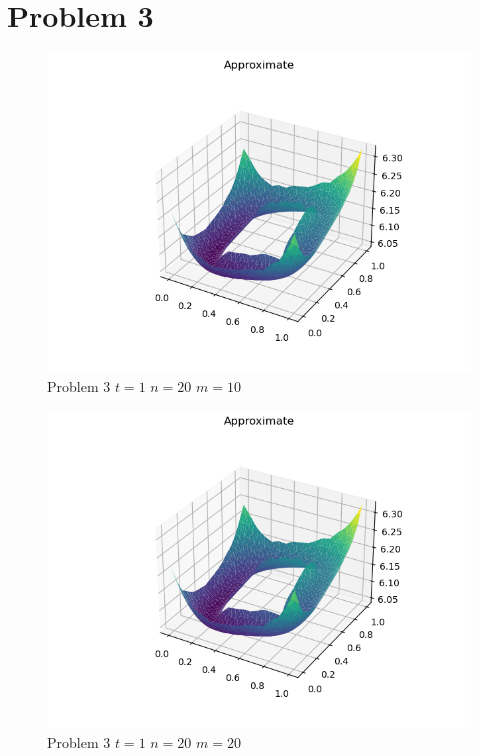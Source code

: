 \documentclass{report}
\begin{document}
\chapter*{Problem 3}
\begin{figure}[h]
	\caption{Problem 3 $t = 1$ $n = 20$ $m = 10$}
	\includegraphics[width=\textwidth]{example.png}
\end{figure}
\begin{figure}[h]
	\caption{Problem 3 $t = 1$ $n = 20$ $m = 20$}
	\includegraphics[width=\textwidth]{example.png}
\end{figure}
\end{document}
